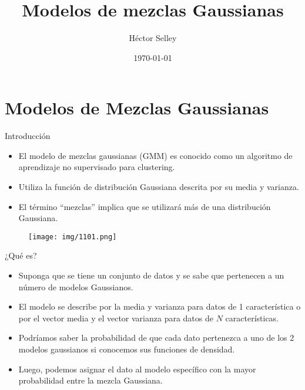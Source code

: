 \documentclass[11pt,aspectratio=169]{beamer}
\author{Héctor Selley}
\title{Modelos de mezclas Gaussianas}
\institute{Universidad Anáhuac México}
\date{\today}
\begin{document}

\begin{frame}
	\titlepage
\end{frame}


\section{Modelos de Mezclas Gaussianas}
\begin{frame}{Introducción}
\begin{itemize}
	\item El modelo de mezclas gaussianas (GMM) es conocido como un algoritmo de aprendizaje no supervisado para clustering.\pause
	\item Utiliza la función de distribución Gaussiana descrita por su media y varianza.\pause
	\item El término ``mezclas'' implica que se utilizará más de una distribución Gaussiana.\pause
\end{itemize}
\begin{figure}[H]
	\centering
	\texttt{[image: img/1101.png]}
\end{figure}
\end{frame}

\begin{frame}{¿Qué es?}
\begin{itemize}
	\item Suponga que se tiene un conjunto de datos y se sabe que pertenecen a un número de modelos Gaussianos. \pause
	\item El modelo se describe por la media y varianza para datos de 1 característica o por el vector media y el vector varianza para datos de $N$
		características. \pause
	\item Podríamos saber la probabilidad de que cada dato pertenezca a uno de los 2 modelos gaussianos si conocemos sus funciones de densidad.\pause
	\item Luego, podemos asignar el dato al modelo específico con la mayor probabilidad entre la mezcla Gaussiana.\pause
\end{itemize}
\end{frame}
\end{document}
